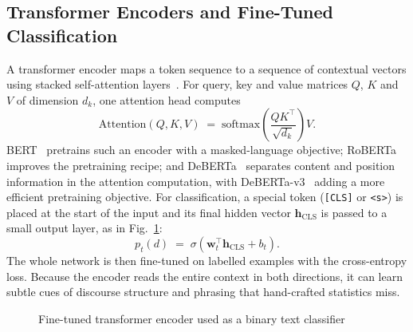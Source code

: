 \subsection{Transformer Encoders and Fine-Tuned Classification}

A transformer encoder maps a token sequence to a sequence of contextual
vectors using stacked self-attention layers~\cite{vaswani2017attention}. For
query, key and value matrices $Q$, $K$ and $V$ of dimension $d_k$, one
attention head computes
\begin{equation}
  \mathrm{Attention}(Q,K,V) \;=\; \mathrm{softmax}\!\left(\frac{QK^{\top}}{\sqrt{d_k}}\right)V.
  \label{eq:attention}
\end{equation}
BERT~\cite{devlin2019bert} pretrains such an encoder with a masked-language
objective; RoBERTa~\cite{liu2019roberta} improves the pretraining recipe; and
DeBERTa~\cite{he2021deberta} separates content and position information in the
attention computation, with DeBERTa-v3~\cite{he2023debertav3} adding a more
efficient pretraining objective. For classification, a special token
(\texttt{[CLS]} or \texttt{<s>}) is placed at the start of the input and its
final hidden vector $\mathbf{h}_{\mathrm{CLS}}$ is passed to a small output
layer, as in Fig.~\ref{fig:encoder}:
\begin{equation}
  p_t(d) \;=\; \sigma\!\left(\mathbf{w}_t^{\top}\mathbf{h}_{\mathrm{CLS}} + b_t\right).
  \label{eq:clshead}
\end{equation}
The whole network is then fine-tuned on labelled examples with the
cross-entropy loss. Because the encoder reads the entire context in both
directions, it can learn subtle cues of discourse structure and phrasing that
hand-crafted statistics miss.

\begin{figure}[H]
\centering
{}
\caption{Fine-tuned transformer encoder used as a binary text classifier}
\label{fig:encoder}
\end{figure}

